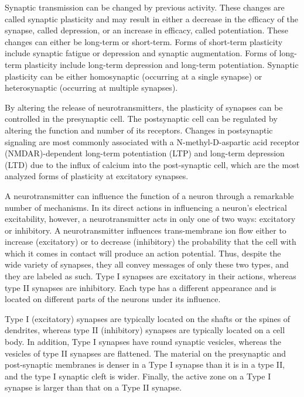 \documentclass[]{book}
\begin{document}
Synaptic transmission can be changed by previous activity. These changes are called synaptic plasticity and may result in either a decrease in the efficacy of the synapse, called depression, or an increase in efficacy, called potentiation. These changes can either be long-term or short-term. Forms of short-term plasticity include synaptic fatigue or depression and synaptic augmentation. Forms of long-term plasticity include long-term depression and long-term potentiation. Synaptic plasticity can be either homosynaptic (occurring at a single synapse) or heterosynaptic (occurring at multiple synapses).

By altering the release of neurotransmitters, the plasticity of synapses can be controlled in the presynaptic cell. The postsynaptic cell can be regulated by altering the function and number of its receptors. Changes in postsynaptic signaling are most commonly associated with a N-methyl-D-aspartic acid receptor (NMDAR)-dependent long-term potentiation (LTP) and long-term depression (LTD) due to the influx of calcium into the post-synaptic cell, which are the most analyzed forms of plasticity at excitatory synapses.

A neurotransmitter can influence the function of a neuron through a remarkable number of mechanisms. In its direct actions in influencing a neuron's electrical excitability, however, a neurotransmitter acts in only one of two ways: excitatory or inhibitory. A neurotransmitter influences trans-membrane ion flow either to increase (excitatory) or to decrease (inhibitory) the probability that the cell with which it comes in contact will produce an action potential. Thus, despite the wide variety of synapses, they all convey messages of only these two types, and they are labeled as such. Type I synapses are excitatory in their actions, whereas type II synapses are inhibitory. Each type has a different appearance and is located on different parts of the neurons under its influence.

Type I (excitatory) synapses are typically located on the shafts or the spines of dendrites, whereas type II (inhibitory) synapses are typically located on a cell body. In addition, Type I synapses have round synaptic vesicles, whereas the vesicles of type II synapses are flattened. The material on the presynaptic and post-synaptic membranes is denser in a Type I synapse than it is in a type II, and the type I synaptic cleft is wider. Finally, the active zone on a Type I synapse is larger than that on a Type II synapse.
\end{document}
